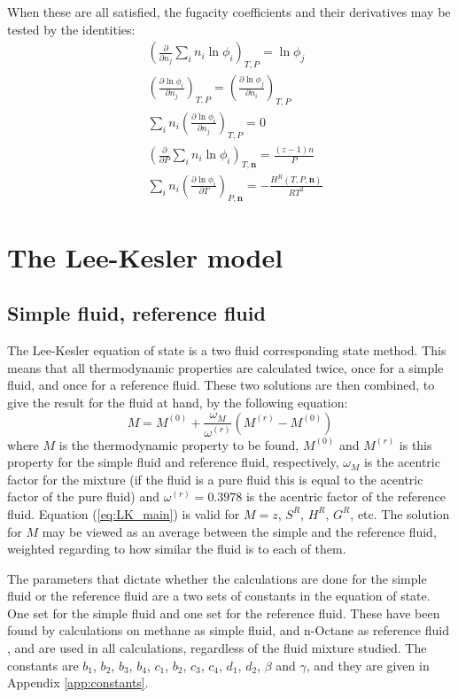 \documentclass[internal,english]{sintefmemo2012}
\numberwithin{equation}{section}
\newcommand*{\pder}[2]{\left(\frac{\partial #1}{\partial #2}\right)}
\newcommand*{\reff}[1]{(\ref{#1})}
\begin{document}
When these are all satisfied, the fugacity coefficients and their derivatives may be tested by the identities:
\begin{align}
\label{test:4}
& \left( \frac{\partial}{\partial n_j} \sum_i n_i \ln \phi_i \right)_{T,P} = \ln \phi_j \\
\label{test:5}
& \pder{\ln \phi_i}{n_j}_{T,P} = \pder{\ln \phi_j}{n_i}_{T,P} \\
\label{test:6}
& \sum_i n_i \pder{\ln \phi_i}{n_j}_{T,P} = 0 \\
\label{test:7}
& \left( \frac{\partial}{\partial P} \sum_i n_i \ln \phi_i \right)_{T,\textbf{n}} = \frac{(z-1) n}{P} \\
\label{test:8}
& \sum_i n_i \pder{ \ln \phi_i}{T}_{P,\textbf{n}} = -\frac{H^R(T,P,\textbf{n})}{RT^2}
\end{align}

\section{The Lee-Kesler model}
\subsection{Simple fluid, reference fluid}
\label{sec:simpRef}
The Lee-Kesler equation of state is a two fluid corresponding state method. This means that all thermodynamic properties are calculated twice, once for a simple fluid, and once for a reference fluid. These two solutions are then combined, to give the result for the fluid at hand, by the following equation:
\begin{equation}
\label{eq:LK_main}
M = M^{(0)} + \frac{\omega_M}{\omega^{(r)}}(M^{(r)} - M^{(0)})
\end{equation}
where $M$ is the thermodynamic property to be found, $M^{(0)}$ and $M^{(r)}$ is this property for the simple fluid and reference fluid, respectively, $\omega_M$ is the acentric factor for the mixture (if the fluid is a pure fluid this is equal to the acentric factor of the pure fluid) and $\omega^{(r)} = 0.3978$ is the acentric factor of the reference fluid. Equation \reff{eq:LK_main} is valid for $M = z$, $S^R$, $H^R$, $G^R$, etc. The solution for $M$ may be viewed as an average between the simple and the reference fluid, weighted regarding to how similar the fluid is to each of them.

The parameters that dictate whether the calculations are done for the simple fluid or the reference fluid are a two sets of constants in the equation of state. One set for the simple fluid and one set for the reference fluid. These have been found by calculations on methane as simple fluid, and n-Octane as reference fluid \cite{LK}, and are used in all calculations, regardless of the fluid mixture studied. The constants are $b_1$, $b_2$, $b_3$, $b_4$, $c_1$, $b_2$, $c_3$, $c_4$, $d_1$, $d_2$, $\beta$ and $\gamma$, and they are given in Appendix \ref{app:constants}.
\end{document}
